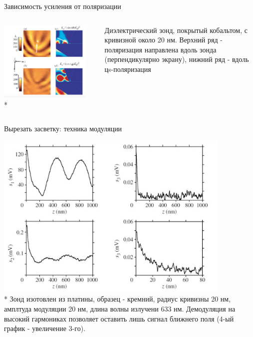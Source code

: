 \documentclass[9pt, compress, xcolor=table]{beamer}
\begin{document}
\begin{frame}{Зависимость усиления от поляризации}
\begin{columns}[c]
\column{8.5cm}
\begin{center}
\includegraphics[width=0.9\textwidth]{nfm33}
\\* 
\end{center}

\column{4cm}

Диэлектрический зонд, покрытый кобальтом, с кривизной около 20 нм. Верхний ряд - поляризация направлена вдоль зонда (перпендикулярно экрану), нижний ряд - вдоль цs-поляризация 

\end{columns}

\end{frame}

\begin{frame}{Вырезать засветку: техника модуляции}

\begin{center}
\includegraphics[width=0.85\textwidth]{nfm7}
\\* Зонд изотовлен из платины, образец - кремний, радиус кривизны 20 нм, амплтуда модуляции 20 нм, длина волны излучени 633 нм. Демодуляция на высокий гармониках позволяет оставить лишь сигнал ближнего поля (4-ый график - увеличение 3-го). 
\end{center}

\end{frame}
\end{document}
